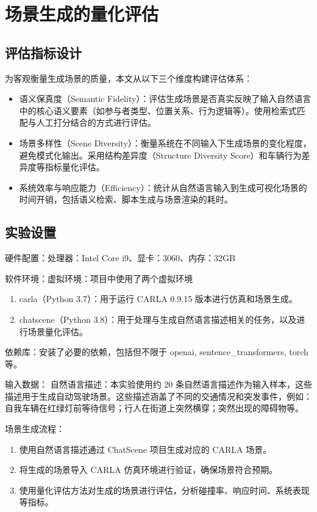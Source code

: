 \section{场景生成的量化评估}

\subsection{评估指标设计}
为客观衡量生成场景的质量，本文从以下三个维度构建评估体系：
\begin{itemize}
	\item 语义保真度（Semantic Fidelity）：评估生成场景是否真实反映了输入自然语言中的核心语义要素（如参与者类型、位置关系、行为逻辑等）。使用检索式匹配与人工打分结合的方式进行评估。
	\item 场景多样性（Scene Diversity）：衡量系统在不同输入下生成场景的变化程度，避免模式化输出。采用结构差异度（Structure Diversity Score）和车辆行为差异度等指标量化评估。
	\item 系统效率与响应能力（Efficiency）：统计从自然语言输入到生成可视化场景的时间开销，包括语义检索、脚本生成与场景渲染的耗时。
\end{itemize}

\subsection{实验设置}
硬件配置：处理器：Intel Core i9、显卡：3060、内存：32GB

软件环境：虚拟环境：项目中使用了两个虚拟环境
\begin{enumerate}
	\item carla（Python 3.7）：用于运行 CARLA 0.9.15 版本进行仿真和场景生成。
	\item chatscene（Python 3.8）：用于处理与生成自然语言描述相关的任务，以及进行场景量化评估。
\end{enumerate}

依赖库：安装了必要的依赖，包括但不限于 openai, sentence\_transformers, torch 等。

输入数据：
自然语言描述：本实验使用约 20 条自然语言描述作为输入样本，这些描述用于生成自动驾驶场景。这些描述涵盖了不同的交通情况和突发事件，例如：自我车辆在红绿灯前等待信号；行人在街道上突然横穿；突然出现的障碍物等。

场景生成流程：
\begin{enumerate}
	\item 使用自然语言描述通过 ChatScene 项目生成对应的 CARLA 场景。
	\item 将生成的场景导入 CARLA 仿真环境进行验证，确保场景符合预期。
	\item 使用量化评估方法对生成的场景进行评估，分析碰撞率、响应时间、系统表现等指标。
\end{enumerate}


